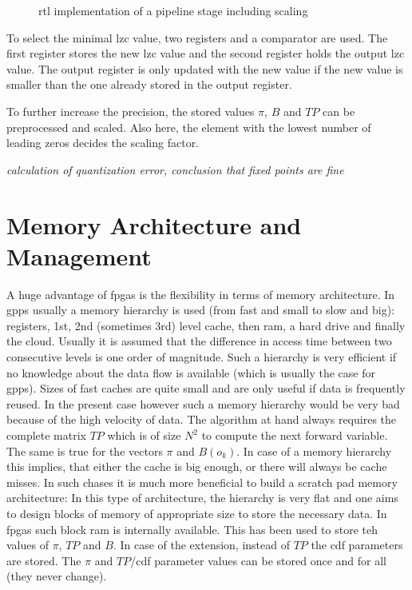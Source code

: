 \documentclass[mscthesis]{usiinfthesis}
\begin{document}
\begin{figure}
    \centering
    
    \caption{\acrshort{rtl} implementation of a pipeline stage including scaling}
    \label{fig:arch_step_scale}
\end{figure}

To select the minimal \gls{lzc} value, two registers and a comparator are used. The
first register stores the new \gls{lzc} value and the second register holds the output
\gls{lzc} value. The output register is only updated with the new value if the new
value is smaller than the one already stored in the output register.

To further increase the precision, the stored values $\pi$, $B$ and $TP$ can be
preprocessed and scaled. Also here, the element with the lowest number of
leading zeros decides the scaling factor.

\emph{\color{red}calculation of quantization error, conclusion that fixed points
are fine}

\section{Memory Architecture and Management}
\label{ch:design_mem}

A huge advantage of \glspl{fpga} is the flexibility in terms of memory
architecture. In \glspl{gpp} usually a memory hierarchy is used (from fast and
small to slow and big): registers, 1st, 2nd (sometimes 3rd) level cache, then
\gls{ram}, a hard drive and finally the cloud. Usually it is assumed that the
difference in access time between two consecutive levels is one order of
magnitude. Such a hierarchy is very efficient if no knowledge about the data
flow is available (which is usually the case for \glspl{gpp}). Sizes of fast
caches are quite small and are only useful if data is frequently reused. In the
present case however such a memory hierarchy would be very bad because of the
high velocity of data. The algorithm at hand always requires the complete
matrix $TP$ which is of size $N^2$ to compute the next forward variable. The
same is true for the vectors $\pi$ and $B(o_k)$. In case of a memory hierarchy
this implies, that either the cache is big enough, or there will always be
cache misses. In such chases it is much more beneficial to build a scratch pad
memory architecture: In this type of architecture, the hierarchy is very flat
and one aims to design blocks of memory of appropriate size to store the
necessary data. In \glspl{fpga} such block ram is internally available. This
has been used to store teh values of $\pi$, $TP$ and $B$. In case of the
extension, instead of $TP$ the \gls{cdf} parameters are stored. The $\pi$ and
$TP$/\gls{cdf} parameter values can be stored once and for all (they never
change).
\end{document}
